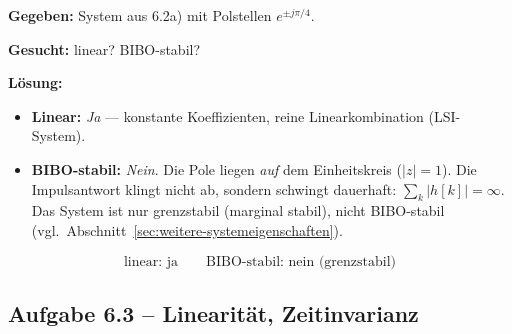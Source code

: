 \begin{beispiel}

\textbf{Gegeben:} System aus 6.2a) mit Polstellen $e^{\pm j\pi/4}$.

\textbf{Gesucht:} linear? BIBO-stabil?

\textbf{Lösung:}
\begin{itemize}
  \item \textbf{Linear:} \emph{Ja} — konstante Koeffizienten, reine
        Linearkombination (LSI-System).
  \item \textbf{BIBO-stabil:} \emph{Nein}. Die Pole liegen \emph{auf} dem
        Einheitskreis ($|z|=1$). Die Impulsantwort klingt nicht ab, sondern
        schwingt dauerhaft: $\sum_{k}|h[k]|=\infty$. Das System ist nur
        grenzstabil (marginal stabil), nicht BIBO-stabil
        (vgl.\ Abschnitt~\ref{sec:weitere-systemeigenschaften}).
\end{itemize}

$$
\boxed{\text{linear: ja}\qquad\text{BIBO-stabil: nein (grenzstabil)}}
$$

\end{beispiel}

\subsection*{Aufgabe 6.3 – Linearität, Zeitinvarianz}

